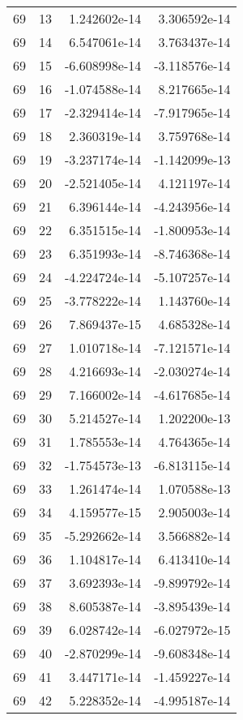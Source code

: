\begin{tabular}{rrrr}
  69 &   13 &  1.242602e-14 &  3.306592e-14 \\
  69 &   14 &  6.547061e-14 &  3.763437e-14 \\
  69 &   15 & -6.608998e-14 & -3.118576e-14 \\
  69 &   16 & -1.074588e-14 &  8.217665e-14 \\
  69 &   17 & -2.329414e-14 & -7.917965e-14 \\
  69 &   18 &  2.360319e-14 &  3.759768e-14 \\
  69 &   19 & -3.237174e-14 & -1.142099e-13 \\
  69 &   20 & -2.521405e-14 &  4.121197e-14 \\
  69 &   21 &  6.396144e-14 & -4.243956e-14 \\
  69 &   22 &  6.351515e-14 & -1.800953e-14 \\
  69 &   23 &  6.351993e-14 & -8.746368e-14 \\
  69 &   24 & -4.224724e-14 & -5.107257e-14 \\
  69 &   25 & -3.778222e-14 &  1.143760e-14 \\
  69 &   26 &  7.869437e-15 &  4.685328e-14 \\
  69 &   27 &  1.010718e-14 & -7.121571e-14 \\
  69 &   28 &  4.216693e-14 & -2.030274e-14 \\
  69 &   29 &  7.166002e-14 & -4.617685e-14 \\
  69 &   30 &  5.214527e-14 &  1.202200e-13 \\
  69 &   31 &  1.785553e-14 &  4.764365e-14 \\
  69 &   32 & -1.754573e-13 & -6.813115e-14 \\
  69 &   33 &  1.261474e-14 &  1.070588e-13 \\
  69 &   34 &  4.159577e-15 &  2.905003e-14 \\
  69 &   35 & -5.292662e-14 &  3.566882e-14 \\
  69 &   36 &  1.104817e-14 &  6.413410e-14 \\
  69 &   37 &  3.692393e-14 & -9.899792e-14 \\
  69 &   38 &  8.605387e-14 & -3.895439e-14 \\
  69 &   39 &  6.028742e-14 & -6.027972e-15 \\
  69 &   40 & -2.870299e-14 & -9.608348e-14 \\
  69 &   41 &  3.447171e-14 & -1.459227e-14 \\
  69 &   42 &  5.228352e-14 & -4.995187e-14 \\

\end{tabular}
